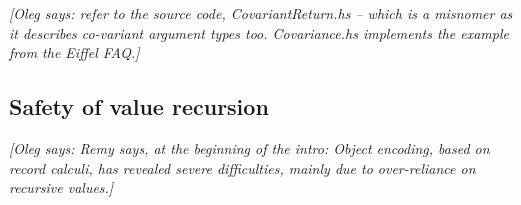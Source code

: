 \documentclass{jfp}
\newcommand{\oleg}[1]{{\it [Oleg says: #1]}}
\begin{document}
\oleg{refer to the source code, CovariantReturn.hs -- which is a
  misnomer as it describes co-variant argument types
  too. Covariance.hs implements the example from the Eiffel FAQ.}

\subsection{Safety of value recursion}
\label{sec:mfix-safety}

\oleg{
Remy says, at the beginning of the intro: Object encoding, based on 
record calculi, has revealed severe difficulties, mainly due to
over-reliance on recursive values.}
\end{document}
